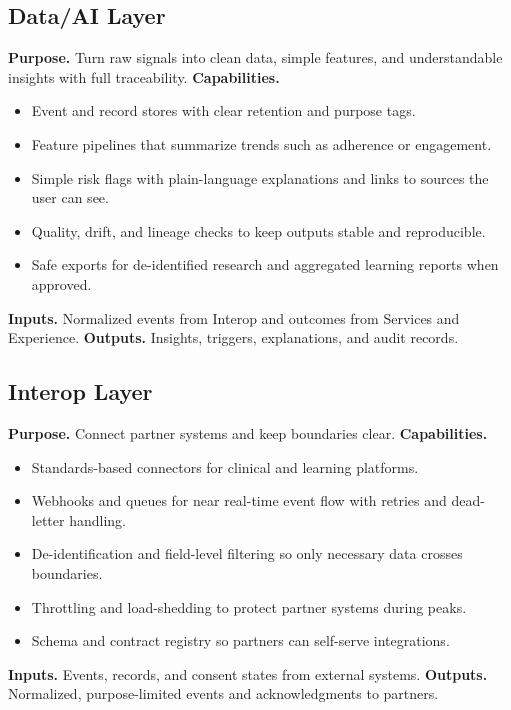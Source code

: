 \documentclass[12pt]{article}
\begin{document}
\subsection*{Data/AI Layer}
\textbf{Purpose.} Turn raw signals into clean data, simple features, and understandable insights with full traceability.  
\textbf{Capabilities.}
\begin{itemize}[leftmargin=*]
  \item Event and record stores with clear retention and purpose tags.
  \item Feature pipelines that summarize trends such as adherence or engagement.
  \item Simple risk flags with plain-language explanations and links to sources the user can see.
  \item Quality, drift, and lineage checks to keep outputs stable and reproducible.
  \item Safe exports for de-identified research and aggregated learning reports when approved.
\end{itemize}
\textbf{Inputs.} Normalized events from Interop and outcomes from Services and Experience.  
\textbf{Outputs.} Insights, triggers, explanations, and audit records.

\subsection*{Interop Layer}
\textbf{Purpose.} Connect partner systems and keep boundaries clear.  
\textbf{Capabilities.}
\begin{itemize}[leftmargin=*]
  \item Standards-based connectors for clinical and learning platforms.
  \item Webhooks and queues for near real-time event flow with retries and dead-letter handling.
  \item De-identification and field-level filtering so only necessary data crosses boundaries.
  \item Throttling and load-shedding to protect partner systems during peaks.
  \item Schema and contract registry so partners can self-serve integrations.
\end{itemize}
\textbf{Inputs.} Events, records, and consent states from external systems.  
\textbf{Outputs.} Normalized, purpose-limited events and acknowledgments to partners.
\end{document}
